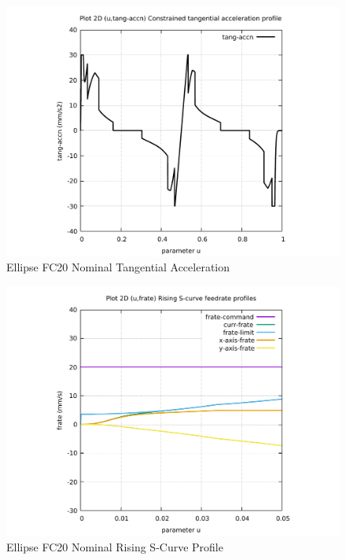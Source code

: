\begin{figure}
	\caption     {Ellipse FC20 Nominal Tangential Acceleration}
	\label{14-img-Ellipse-FC20-Nominal-Tangential-Acceleration.pdf}
	\includegraphics[width=1.00\textwidth]{Chap4/appendix/app-Ellipse/plots/14-img-Ellipse-FC20-Nominal-Tangential-Acceleration.pdf}
\end{figure}

\clearpage
\pagebreak

\begin{figure}
	\caption     {Ellipse FC20 Nominal Rising S-Curve Profile}
	\label{15-img-Ellipse-FC20-Nominal-Rising-S-Curve-Profile.pdf}
	\includegraphics[width=1.00\textwidth]{Chap4/appendix/app-Ellipse/plots/15-img-Ellipse-FC20-Nominal-Rising-S-Curve-Profile.pdf}
\end{figure}


